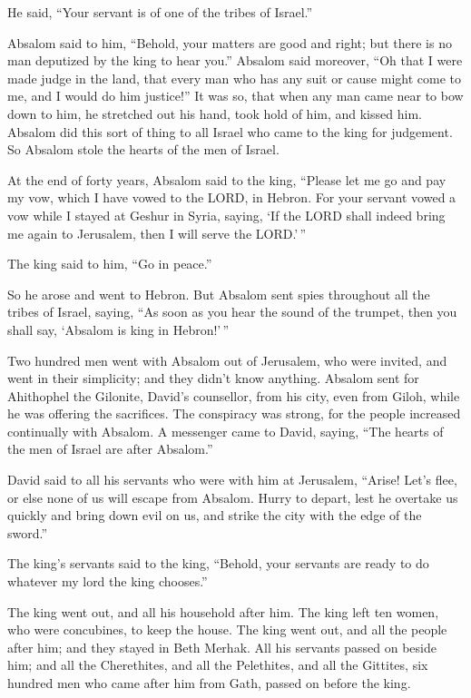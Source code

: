 He said, ``Your servant is of one of the tribes of Israel.''

 Absalom said to him, ``Behold, your matters are good and
right; but there is no man deputized by the king to hear you.''
 Absalom said moreover, ``Oh that I were made judge in the
land, that every man who has any suit or cause might come to me, and I
would do him justice!''  It was so, that when any man came
near to bow down to him, he stretched out his hand, took hold of him,
and kissed him.  Absalom did this sort of thing to all
Israel who came to the king for judgement. So Absalom stole the hearts
of the men of Israel.

 At the end of forty years, Absalom said to the king,
``Please let me go and pay my vow, which I have vowed to the LORD, in
Hebron.  For your servant vowed a vow while I stayed at
Geshur in Syria, saying, `If the LORD shall indeed bring me again to
Jerusalem, then I will serve the LORD.'\,''

 The king said to him, ``Go in peace.''

So he arose and went to Hebron.  But Absalom sent spies
throughout all the tribes of Israel, saying, ``As soon as you hear the
sound of the trumpet, then you shall say, `Absalom is king in
Hebron!'\,''

 Two hundred men went with Absalom out of Jerusalem, who
were invited, and went in their simplicity; and they didn't know
anything.  Absalom sent for Ahithophel the Gilonite,
David's counsellor, from his city, even from Giloh, while he was
offering the sacrifices. The conspiracy was strong, for the people
increased continually with Absalom.  A messenger came to
David, saying, ``The hearts of the men of Israel are after Absalom.''

 David said to all his servants who were with him at
Jerusalem, ``Arise! Let's flee, or else none of us will escape from
Absalom. Hurry to depart, lest he overtake us quickly and bring down
evil on us, and strike the city with the edge of the sword.''

 The king's servants said to the king, ``Behold, your
servants are ready to do whatever my lord the king chooses.''

 The king went out, and all his household after him. The
king left ten women, who were concubines, to keep the house.
 The king went out, and all the people after him; and
they stayed in Beth Merhak.  All his servants passed on
beside him; and all the Cherethites, and all the Pelethites, and all the
Gittites, six hundred men who came after him from Gath, passed on before
the king.

